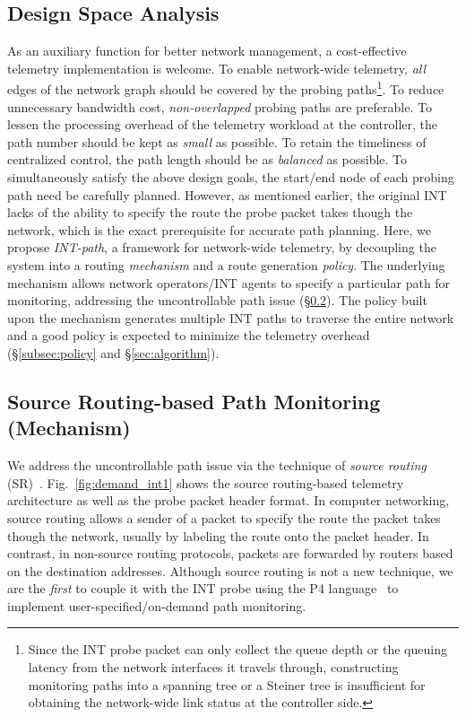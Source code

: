 \subsection{Design Space Analysis}
As an auxiliary function for better network management, a cost-effective telemetry implementation is welcome. To enable network-wide telemetry, \emph{all} edges of the network graph should be covered by the probing paths\footnote{Since the INT probe packet can only collect the queue depth or the queuing latency from the network interfaces it travels through, constructing monitoring paths into a spanning tree or a Steiner tree is insufficient for obtaining the network-wide link status at the controller side.}. To reduce unnecessary bandwidth cost, \emph{non-overlapped} probing paths are preferable. To lessen the processing overhead of the telemetry workload at the controller, the path number should be kept as \emph{small} as possible. To retain the timeliness of centralized control, the path length should be as \emph{balanced} as possible. To simultaneously satisfy the above design goals, the start/end node of each probing path need be carefully planned. However, as mentioned earlier, the original INT lacks of the ability to specify the route the probe packet takes though the network, which is the exact prerequisite for accurate path planning. Here, we propose \emph{INT-path}, a framework for network-wide telemetry, by decoupling the system into a routing \emph{mechanism} and a route generation \emph{policy}. The underlying mechanism allows network operators/INT agents to specify a particular path for monitoring, addressing the uncontrollable path issue (\S\ref{subsec:mechanism}). The policy built upon the mechanism generates multiple INT paths to traverse the entire network and a good policy is expected to minimize the telemetry overhead (\S\ref{subsec:policy} and \S\ref{sec:algorithm}).

\subsection{Source Routing-based Path Monitoring (Mechanism)}
\label{subsec:mechanism}

We address the uncontrollable path issue via the technique of \emph{source routing} (SR)~\cite{sunshine1977source}. Fig.~\ref{fig:demand_int1} shows the source routing-based telemetry architecture as well as the probe packet header format. In computer networking, source routing allows a sender of a packet to specify the route the packet takes though the network, usually by labeling the route onto the packet header. In contrast, in non-source routing protocols, packets are forwarded by routers based on the destination addresses. Although source routing is not a new technique, we are the \emph{first} to couple it with the INT probe using the P4 language~\cite{bosshart2014p4} to implement user-specified/on-demand path monitoring.




